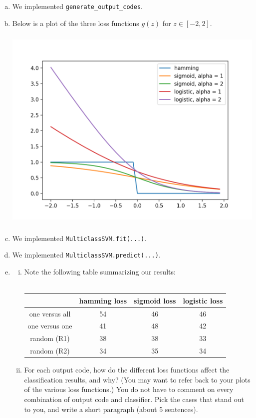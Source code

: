 \documentclass[11pt]{article}
\begin{document}
\begin{enumerate}[(a)]
	\item We implemented \verb+generate_output_codes+.
	\item Below is a plot of the three loss functions $g(z)$ for $z \in [-2, 2]$. 
\begin{center}
\includegraphics[width = 15cm, height = 10cm]{loss_funcs.png}
\end{center}
	\item We implemented \verb+MulticlassSVM.fit(...)+.
	\item We implemented \verb+MulticlassSVM.predict(...)+.
	\item 
\begin{enumerate}[i.]
	\item Note the following table summarizing our results: \\ \\
\begin{tabular}{  c | c | c | c | } 
& hamming loss & sigmoid loss & logistic loss \\
\hline
one versus all & 54 & 46 & 46\\ 
\hline
one versus one & 41 & 48 & 42\\ 
\hline
random (R1) & 38 & 38 & 33\\ 
\hline
random (R2) & 34 & 35 & 34\\ 
\hline
\end{tabular}


	\item For each output code, how do the different loss functions affect the classification results, and why? (You may want to refer back to your plots of the various loss functions.) You do not have to comment on every combination of output code and classifier. Pick the cases that stand out to you, and write a short paragraph (about 5 sentences). \\


\end{enumerate}
\end{enumerate}
\end{document}
